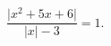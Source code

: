 \begin{ex}[type=equation]
	\begin{condition}
	$\dfrac{\big | x^2+5x + 6\big|}{\big|x\big| - 3} = 1.$
	\end{condition}
\end{ex}